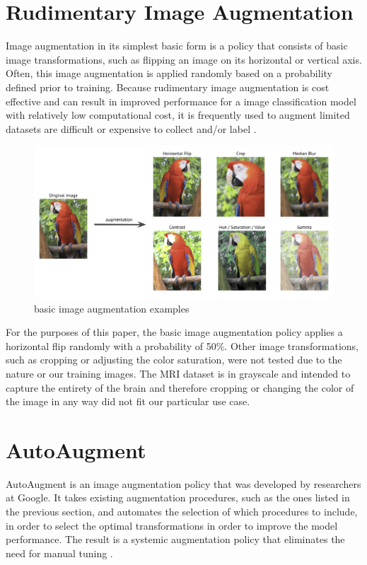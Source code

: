 \documentclass [MAS] {uclathes}
\begin{document}
\section{Rudimentary Image Augmentation}
Image augmentation in its simplest basic form is a policy that consists of basic image transformations, such as flipping
an image on its horizontal or vertical axis. Often, this image augmentation is applied randomly based on a probability 
defined prior to training. Because rudimentary image augmentation is cost effective and can result in improved 
performance for a image classification model with relatively low computational cost, it is frequently used to augment 
limited datasets are difficult or expensive to collect and/or label \cite{augment}.

\begin{figure} [H]
    \centering
    \includegraphics[width=0.75\linewidth]{figures/basic-image-augmentation-example.png}
    \caption{basic image augmentation examples \cite{augment}}
\end{figure}

For the purposes of this paper, the basic image augmentation policy applies a horizontal flip randomly with a 
probability of 50\%. Other image transformations, such as cropping or adjusting the color saturation, were not tested 
due to the nature or our training images. The MRI dataset is in grayscale and intended to capture the entirety of the 
brain and therefore cropping or changing the color of the image in any way did not fit our particular use case. 

\section{AutoAugment}
AutoAugment is an image augmentation policy that was developed by researchers at Google. It takes existing augmentation 
procedures, such as the ones listed in the previous section, and automates the selection of which procedures to include,
in order to select the optimal transformations in order to improve the model performance. The result is a systemic 
augmentation policy that eliminates the need for manual tuning \cite{autoaugment}. 
\end{document}
